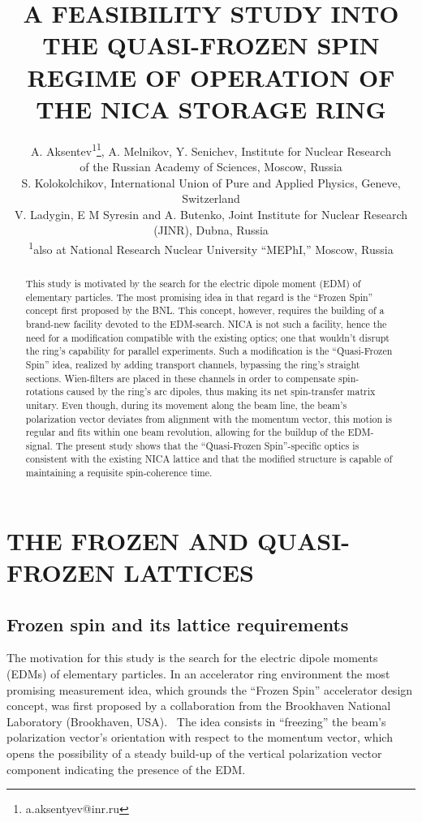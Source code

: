 \documentclass[a4paper]{jacow}
\begin{document}
	\title{A FEASIBILITY STUDY INTO THE QUASI-FROZEN SPIN REGIME OF OPERATION OF THE NICA STORAGE RING}
	\author{A. Aksentev\textsuperscript{1}\thanks{a.aksentyev@inr.ru}, 	A. Melnikov, Y. Senichev, Institute for Nuclear Research\\ of the Russian Academy of Sciences, Moscow, Russia \\
		S. Kolokolchikov, International Union of Pure and Applied Physics, Geneve, Switzerland \\
		V. Ladygin, E M Syresin and A. Butenko, Joint Institute for Nuclear Research (JINR), Dubna, Russia\\
		\textsuperscript{1}also at National Research Nuclear University ``MEPhI,'' Moscow, Russia
	}
	\maketitle

	\begin{abstract}
		This study is motivated by the search for the electric dipole moment (EDM) of elementary particles. The most promising idea in that regard is the ``Frozen Spin'' concept first proposed by the BNL. This concept, however, requires the building of a brand-new facility devoted to the EDM-search. NICA is not such a facility, hence the need for a modification compatible with the existing optics; one that wouldn’t disrupt the ring’s capability for parallel experiments. Such a modification is the ``Quasi-Frozen Spin'' idea, realized by adding transport channels, bypassing the ring’s straight sections. Wien-filters are placed in these channels in order to compensate spin-rotations caused by the ring’s arc dipoles, thus making its net spin-transfer matrix unitary. Even though, during its movement along the beam line, the beam’s polarization vector deviates from alignment with the momentum vector, this motion is regular and fits within one beam revolution, allowing for the buildup of the EDM-signal. The present study shows that the ``Quasi-Frozen Spin''-specific optics is consistent with the existing NICA lattice and that the modified structure is capable of maintaining a requisite spin-coherence time.
	\end{abstract}

\section{THE FROZEN AND QUASI-FROZEN LATTICES}
\subsection{Frozen spin and its lattice requirements}
The motivation for this study is the search for the electric dipole moments (EDMs) of elementary particles. In an accelerator ring environment the most promising measurement idea, which grounds the ``Frozen Spin'' accelerator design concept, was first proposed by a collaboration from the Brookhaven National Laboratory (Brookhaven, USA).~\cite{AGS4deuterons} The idea consists in ``freezing'' the beam's polarization vector's orientation with respect to the momentum vector, which opens the possibility of a steady build-up of the vertical polarization vector component indicating the presence of the EDM.
\end{document}
